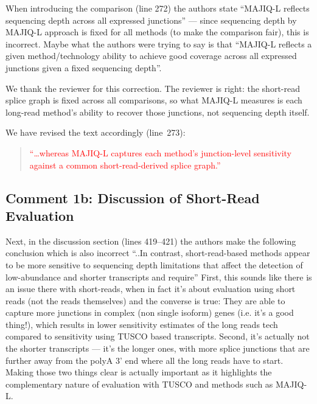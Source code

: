 \documentclass[11pt]{article}
\begin{document}
\begin{reviewercomment}
When introducing the comparison (line 272) the authors state ``MAJIQ-L reflects sequencing depth across all expressed junctions'' --- since sequencing depth by MAJIQ-L approach is fixed for all methods (to make the comparison fair), this is incorrect. Maybe what the authors were trying to say is that ``MAJIQ-L reflects a given method/technology ability to achieve good coverage across all expressed junctions given a fixed sequencing depth''.
\end{reviewercomment}

\begin{responseboxnew}
We thank the reviewer for this correction. The reviewer is right: the short-read splice graph is fixed across all comparisons, so what MAJIQ-L measures is each long-read method's ability to recover those junctions, not sequencing depth itself.

We have revised the text accordingly (line~273):

\begin{quote}
\textcolor{red}{``\ldots whereas MAJIQ-L captures each method's junction-level sensitivity against a common short-read-derived splice graph.''}
\end{quote}
\end{responseboxnew}

\subsection{Comment 1b: Discussion of Short-Read Evaluation}

\begin{reviewercomment}
Next, in the discussion section (lines 419--421) the authors make the following conclusion which is also incorrect ``..In contrast, short-read-based methods appear to be more sensitive to sequencing depth limitations that affect the detection of low-abundance and shorter transcripts and require'' First, this sounds like there is an issue there with short-reads, when in fact it's about evaluation using short reads (not the reads themselves) and the converse is true: They are able to capture more junctions in complex (non single isoform) genes (i.e. it's a good thing!), which results in lower sensitivity estimates of the long reads tech compared to sensitivity using TUSCO based transcripts. Second, it's actually not the shorter transcripts --- it's the longer ones, with more splice junctions that are further away from the polyA 3' end where all the long reads have to start. Making those two things clear is actually important as it highlights the complementary nature of evaluation with TUSCO and methods such as MAJIQ-L.
\end{reviewercomment}
\end{document}
